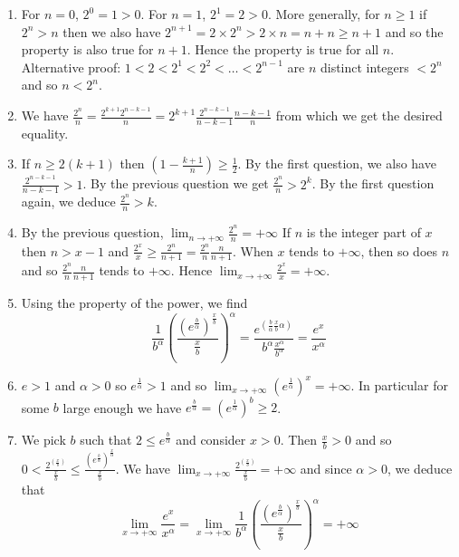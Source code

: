 \begin{enumerate}
\item
  For $n = 0$, $2^0 = 1 > 0$.
  For $n = 1$, $2^1 = 2 > 0$. More generally, for $n \geq 1$ if
  $2^{n} > n$ then we also have $2^{n+1} = 2 \times 2^n > 2 \times n = n + n \geq
  n + 1$ and so the property is also true for $n+1$. Hence the property is true
  for all $n$.
  Alternative proof:
  $1 < 2 < 2^1 < 2^2 < \dots < 2^{n-1}$ are $n$ distinct integers
  $< 2^n$ and so $n < 2^n$.

\item We have $\frac{2^n}{n} = \frac{2^{k+1} 2^{n-k-1}}{n} =
  2^{k+1} \frac{2^{n-k-1}}{n-k-1} \frac{n-k-1}{n}$ from which we get the desired
  equality.
\item If $n \geq 2{(k+1)}$ then
  $\left(1-\frac{k+1}{n}\right) \geq \frac{1}{2}$. By the first question,
  we also have $\frac{2^{n-k-1}}{n-k-1} > 1$. By the previous question we get
  $\frac{2^n}{n} > 2^k$. By the first question again, we deduce
  $\frac{2^n}{n} > k$.

\item By the previous question,
  $\lim_{n \rightarrow +\infty} \frac{2^n}{n} = +\infty$
  If $n$ is the integer part of $x$ then
  $n > x - 1$ and
  $\frac{2^x}{x} \geq \frac{2^n}{n+1} = \frac{2^n}{n} \frac{n}{n+1}$.
  When $x$ tends to $+\infty$, then so does $n$
  and so $\frac{2^n}{n} \frac{n}{n+1}$ tends to $+\infty$. Hence
  $\lim_{x \rightarrow +\infty} \frac{2^x}{x} = +\infty$.

  \item Using the property of the power, we find
    $$
    \frac{1}{b^\alpha} \left( \frac{\left(e^{\frac{b}{\alpha}}\right)^{\frac{x}{b}}}{\frac{x}{b}} \right)^\alpha =
    \frac{e^{\left(\frac{b}{\alpha} \frac{x}{b} \alpha \right)}}{b^\alpha \frac{x^\alpha}{b^\alpha}} = \frac{e^x}{x^\alpha}
    $$

  \item $e > 1$ and $\alpha > 0$ so $e^{\frac{1}{\alpha}} > 1$ and so
    $\lim_{x \rightarrow +\infty} \left(e^{\frac{1}{\alpha}}\right)^x = +\infty$.
    In particular for some $b$ large enough we have
    $e^{\frac{b}{\alpha}} = \left(e^{\frac{1}{\alpha}}\right)^b \geq 2$.

  \item We pick $b$ such that $2 \leq e^{\frac{b}{\alpha}}$ and consider
    $x > 0$. Then $\frac{x}{b} > 0$ and
    so $0 < \frac{2^{\left(\frac{x}{b}\right)}}{\frac{x}{b}} \leq
    \frac{\left(e^{\frac{b}{\alpha}}\right)^{\frac{x}{\alpha}}}{\frac{x}{b}}$.
    We have $\lim_{x \rightarrow +\infty} \frac{2^{\left(\frac{x}{b}\right)}}{\frac{x}{b}} = +\infty$ and since $\alpha > 0$, we deduce that
    $$
    {\lim_{x \rightarrow +\infty}
      \frac{e^x}{x^\alpha}} =
    {\lim_{x \rightarrow +\infty} \frac{1}{b^\alpha} \left( \frac{\left(e^{\frac{b}{\alpha}}\right)^{\frac{x}{b}}}{\frac{x}{b}} \right)^\alpha}
 = +\infty
    $$


\end{enumerate}

